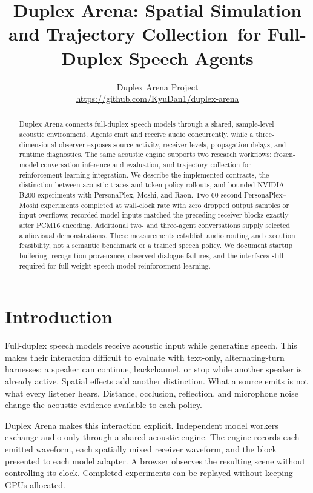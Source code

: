 \documentclass{article}
\title{Duplex Arena: Spatial Simulation and Trajectory Collection\ for Full-Duplex Speech Agents}
\author{Duplex Arena Project\\\url{https://github.com/KyuDan1/duplex-arena}}
\begin{document}
\maketitle
\begin{abstract}
Duplex Arena connects full-duplex speech models through a shared, sample-level acoustic environment. Agents emit and receive audio concurrently, while a three-dimensional observer exposes source activity, receiver levels, propagation delays, and runtime diagnostics. The same acoustic engine supports two research workflows: frozen-model conversation inference and evaluation, and trajectory collection for reinforcement-learning integration. We describe the implemented contracts, the distinction between acoustic traces and token-policy rollouts, and bounded NVIDIA B200 experiments with PersonaPlex, Moshi, and Raon. Two 60-second PersonaPlex--Moshi experiments completed at wall-clock rate with zero dropped output samples or input overflows; recorded model inputs matched the preceding receiver blocks exactly after PCM16 encoding. Additional two- and three-agent conversations supply selected audiovisual demonstrations. These measurements establish audio routing and execution feasibility, not a semantic benchmark or a trained speech policy. We document startup buffering, recognition provenance, observed dialogue failures, and the interfaces still required for full-weight speech-model reinforcement learning.
\end{abstract}

\section{Introduction}
Full-duplex speech models receive acoustic input while generating speech. This makes their interaction difficult to evaluate with text-only, alternating-turn harnesses: a speaker can continue, backchannel, or stop while another speaker is already active. Spatial effects add another distinction. What a source emits is not what every listener hears. Distance, occlusion, reflection, and microphone noise change the acoustic evidence available to each policy.

Duplex Arena makes this interaction explicit. Independent model workers exchange audio only through a shared acoustic engine. The engine records each emitted waveform, each spatially mixed receiver waveform, and the block presented to each model adapter. A browser observes the resulting scene without controlling its clock. Completed experiments can be replayed without keeping GPUs allocated.
\end{document}

